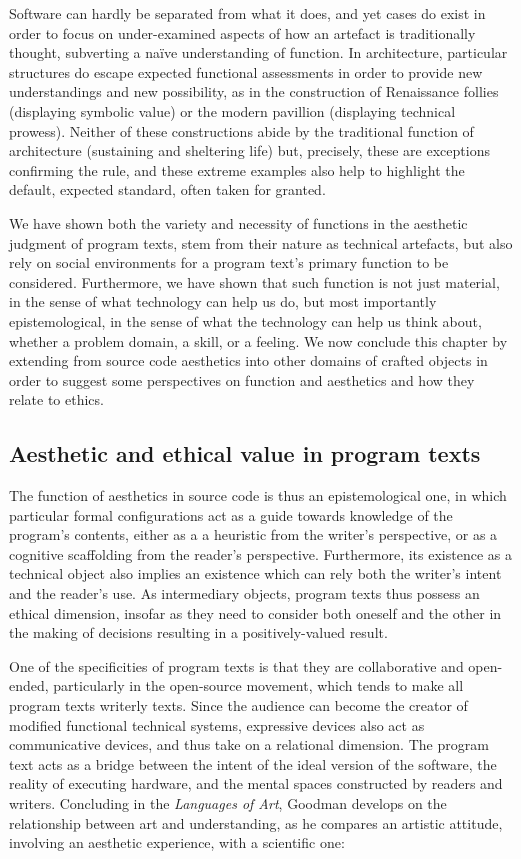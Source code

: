 Software can hardly be separated from what it does, and yet cases do exist in order to focus on under-examined aspects of how an artefact is traditionally thought, subverting a naïve understanding of function. In architecture, particular structures do escape expected functional assessments in order to provide new understandings and new possibility, as in the construction of Renaissance follies (displaying symbolic value) or the modern pavillion (displaying technical prowess). Neither of these constructions abide by the traditional function of  architecture (sustaining and sheltering life) but, precisely, these are exceptions confirming the rule, and these extreme examples also help to highlight the default, expected standard, often taken for granted.

We have shown both the variety and necessity of functions in the aesthetic judgment of program texts, stem from their nature as technical artefacts, but also rely on social environments for a program text's primary function to be considered. Furthermore, we have shown that such function is not just material, in the sense of what technology can help us do, but most importantly epistemological, in the sense of what the technology can help us think about, whether a problem domain, a skill, or a feeling. We now conclude this chapter by extending from source code aesthetics into other domains of crafted objects in order to suggest some perspectives on function and aesthetics and how they relate to ethics.

\subsection{Aesthetic and ethical value in program texts}
\label{subsec:aesthetic-ethic-program-texts}

The function of aesthetics in source code is thus an epistemological one, in which particular formal configurations act as a guide towards knowledge of the program's contents, either as a a heuristic from the writer's perspective, or as a cognitive scaffolding from the reader's perspective. Furthermore, its existence as a technical object also implies an existence which can rely both the writer's intent and the reader's use. As intermediary objects, program texts thus possess an ethical dimension, insofar as they need to consider both oneself and the other in the making of decisions resulting in a positively-valued result.

One of the specificities of program texts is that they are collaborative and open-ended, particularly in the open-source movement, which tends to make all program texts writerly texts. Since the audience can become the creator of modified functional technical systems, expressive devices also act as communicative devices, and thus take on a relational dimension. The program text acts as a bridge between the intent of the ideal version of the software, the reality of executing hardware, and the mental spaces constructed by readers and writers. Concluding in the \emph{Languages of Art}, Goodman develops on the relationship between art and understanding, as he compares an artistic attitude, involving an aesthetic experience, with a scientific one:

